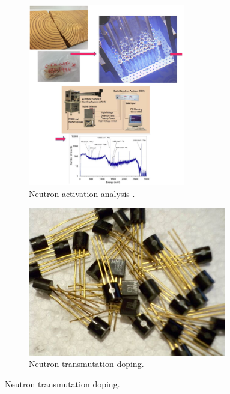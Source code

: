 \begin{figure}[htbp!] %
  \centering
  \begin{subfigure}[b]{0.45\textwidth}
    \centering
    \includegraphics[width=0.75\textwidth]{figures/neutron-activation}
    \caption{Neutron activation analysis \cite{neutron-activation}.}
  \end{subfigure}
  \hfill
  \begin{subfigure}[b]{0.53\textwidth}
    \centering
    \includegraphics[width=0.95\textwidth]{figures/neutron-transmutation}
    \caption{Neutron transmutation doping.}
  \end{subfigure}

\end{figure}
